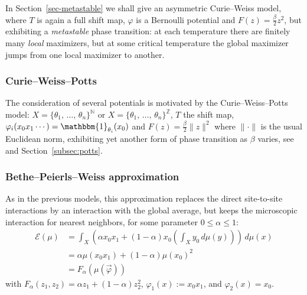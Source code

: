 \documentclass[AHL, Unicode, longabstracts,published]{cedram}
\theoremstyle{plain}
\theoremstyle{plain}
\newcommand{\pot}{\varphi}
\newcounter{In}
\newcommand*\8{\infty}
\newcommand\NN{\mathbb{N}}
\newcommand\ZZ{\mathbb{Z}}
\newcommand{\En}{\mathcal{E}}
\begin{document}
In Section~\ref{sec-metastable} we shall give an asymmetric Curie--Weiss model, where $T$ is again a full shift map, $\pot$ is a Bernoulli potential and $F(z)=\frac\beta2z^2$, but exhibiting a \emph{metastable} phase transition: at each temperature there are finitely many \emph{local} maximizers, but at some critical temperature the global maximizer jumps from one local maximizer to another.

\subsubsection{Curie--Weiss--Potts}

{The consideration of several potentials is motivated by} the Curie--Weiss--Potts model: $X=\{\theta_1,\,\dots,\,\theta_n\}^{\NN}$ or $X=\{\theta_1,\,\dots,\, \theta_n\}^{\ZZ}$, $T$ the shift map, $\pot_i(x_0x_1\cdots)=\mathbbm{1}_{\theta_i}(x_0)$ and $F(z)=\frac{\beta}{2} \lVert z\rVert^2$ where $\lVert\cdot\rVert$ is the usual Euclidean norm, exhibiting yet another form of phase transition as $\beta$ varies, see~\cite{Leplaideur-Watbled-2} and Section~\ref{subsec:potts}.


\subsubsection{Bethe--Peierls--Weiss approximation}\label{subsubsec-PRW}
As in the previous models, this approximation replaces the direct site-to-site interactions by an interaction with the global average, but keeps the microscopic interaction for nearest neighbors, for some parameter $0\le\alpha\le1$:
\begin{align*}
\En(\mu) &= \int_X \left(\alpha x_0 x_1 + (1-\alpha)x_0\left(\int_X y_0\,d\mu(y)\right)\right) \, d\mu(x)\\
&=\alpha \mu(x_0x_1) + (1-\alpha) \mu(x_0)^2 \\
&= F_\alpha(\mu(\vec\pot))
\end{align*}
with $F_\alpha(z_1,z_2)=\alpha z_1 +(1-\alpha) z_2^2$, $\pot_1(x):=x_0x_1$, and $ \pot_2(x)=x_0$.
\end{document}
